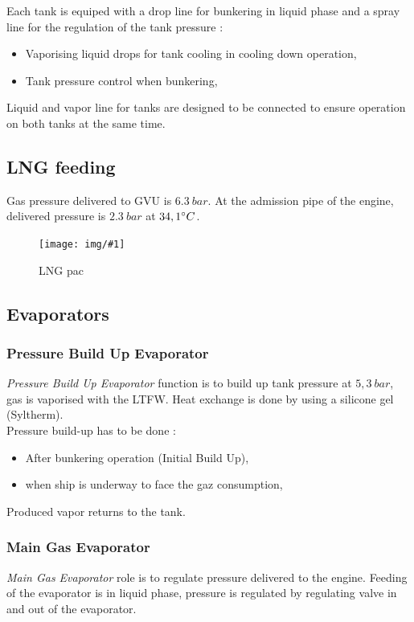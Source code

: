 \documentclass[12pt,a4paper]{article}
\newcommand{\image}[3]
 {\begin{figure}[H]
         \begin{center}
          \texttt{[image: img/\#1]}
          \caption{#2} \label{img_#1}
         \end{center}
  \end{figure}
}
\begin{document}
Each tank is equiped with a drop line for bunkering in liquid phase and a spray line for the regulation of the tank pressure :

\begin{itemize}
 \item Vaporising liquid drops for tank cooling in cooling down operation,
 \item Tank pressure control when bunkering,
\end{itemize}

Liquid and vapor line for tanks are designed to be connected to ensure operation on both tanks at the same time.

\subsection{LNG feeding}

Gas pressure delivered to GVU is $6.3~ bar$. At the admission pipe of the engine, delivered pressure is $2.3~ bar$ at $34,1 \degree C$.

\image{LNGPAC}{LNG pac}{0.6}
\subsection{Evaporators}

\subsubsection{Pressure Build Up Evaporator}

\emph{Pressure Build Up Evaporator} function is to build up tank pressure at $5,3~bar$, gas is vaporised with the LTFW. Heat exchange is done by using a silicone gel (Syltherm).\\

Pressure build-up has to be done : 
\begin{itemize}
    \item After bunkering operation (Initial Build Up),
    \item when ship is underway to face the gaz consumption,
\end{itemize}
Produced vapor returns to the tank.



\subsubsection{Main Gas Evaporator}


\emph{Main Gas Evaporator} role is to regulate pressure delivered to the engine. Feeding of the evaporator is in liquid phase, pressure is regulated by regulating valve in and out of the evaporator.
\end{document}

